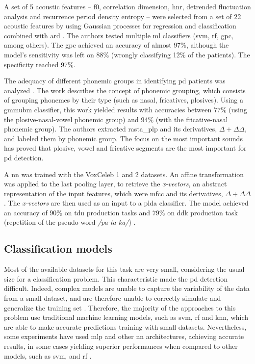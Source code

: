 A set of 5 acoustic features -- \gls{f0}, correlation dimension,  \gls{hnr}, detrended fluctuation analysis and recurrence period density entropy -- were selected from a set of 22 acoustic features by using Gaussian processes for regression and classification combined with \gls{ard} \cite{parkinson_acoustic_despotovic}. The authors tested multiple \gls{ml} classifiers (\gls{svm}, \gls{rf}, \gls{gpc}, among others). The \gls{gpc} achieved an accuracy of almost 97\%, although the model's sensitivity was left on 88\% (wrongly classifying 12\% of the patients). The specificity reached 97\%.

The adequacy of different phonemic groups in identifying \gls{pd} patients was analyzed \cite{parkinson_phonemic_relevance}. The work describes the concept of phonemic grouping, which consists of grouping phonemes by their type (such as nasal, fricatives, plosives). Using a \gls{gmmubm} classifier, this work yielded results with accuracies between 77\% (using the plosive-nasal-vowel phonemic group) and 94\% (with the fricative-nasal phonemic group). The authors extracted \gls{rasta_plp} \cite{rastaPLP} and its derivatives, $\Delta + \Delta \Delta$, and labeled them by phonemic group. The focus on the most important sounds has proved that plosive, vowel and fricative segments are the most important for \gls{pd} detection.

A \gls{nn} was trained with the VoxCeleb 1 \cite{voxceleb1} and 2 \cite{voxceleb2} datasets. An affine transformation was applied to the last pooling layer, to retrieve the \textit{x-vectors}, an abstract representation of the input features, which were \gls{mfcc} and its derivatives, $\Delta + \Delta \Delta$. The \textit{x-vectors} are then used as an input to a \gls{plda} classifier. The model achieved an accuracy of 90\% on \gls{tdu} production tasks and 79\% on \gls{ddk} production task (repetition of the pseudo-word \textit{/pa-ta-ka/}) \cite{x_vector_parkinson}.

\subsection{Classification models}

Most of the available datasets for this task are very small, considering the usual size for a classification problem. This characteristic made the \gls{pd} detection difficult. Indeed, complex models are unable to capture the variability of the data from a small dataset, and are therefore unable to correctly simulate and generalize the training set \cite{underfitting_small_datasets}. Therefore, the majority of the approaches to this problem use traditional machine learning models, such as \gls{svm}, \gls{rf} and \gls{knn}, which are able to make accurate predictions training with small datasets. Nevertheless, some experiments have used \gls{mlp} and other \gls{nn} architectures, achieving accurate results, in some cases yielding superior performances when compared to other models, such as \gls{svm}, and \gls{rf} \cite{deep_mlp_parkinson}.

